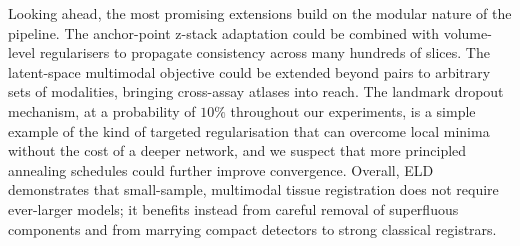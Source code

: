 \documentclass[11pt]{article}
\begin{document}
Looking ahead, the most promising extensions build on the modular nature of the pipeline. The anchor-point z-stack adaptation could be combined with volume-level regularisers to propagate consistency across many hundreds of slices. The latent-space multimodal objective could be extended beyond pairs to arbitrary sets of modalities, bringing cross-assay atlases into reach. The landmark dropout mechanism, at a probability of $10\%$ throughout our experiments, is a simple example of the kind of targeted regularisation that can overcome local minima without the cost of a deeper network, and we suspect that more principled annealing schedules could further improve convergence. Overall, ELD demonstrates that small-sample, multimodal tissue registration does not require ever-larger models; it benefits instead from careful removal of superfluous components and from marrying compact detectors to strong classical registrars.



\end{document}
